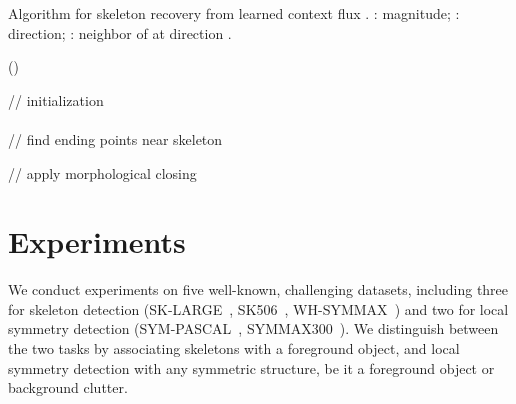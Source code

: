 \documentclass[10pt,twocolumn,letterpaper]{article}
\begin{document}
{\begin{algorithm}[t]
\caption{Algorithm for skeleton recovery from learned context flux . : magnitude; : direction; : neighbor of  at direction .}
\label{algo:skeletonrecovery}
\DontPrintSemicolon

\Begin()
{
    // initialization \\
     \\
    // find ending points near skeleton \\
    \ForEach{}
    {
        {
        	
        }
    }
    // apply morphological closing \\
     \;
    \Return{} \;
}
\end{algorithm}

\section{Experiments} \label{sec:experiments}
We conduct experiments on five well-known, challenging datasets, including three for skeleton detection (SK-LARGE~\cite{shen2017lmsds}, SK506~\cite{shen2016fsds}, WH-SYMMAX~\cite{shen2016misl}) and two for local symmetry detection (SYM-PASCAL~\cite{ke2017srn}, SYMMAX300~\cite{tsogkas2012mil}).
We distinguish between the two tasks by associating skeletons with a foreground object, and local symmetry detection with any symmetric structure, be it a foreground object or background clutter.

}
\end{document}
